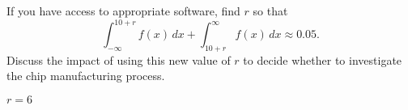 \begin{exercises}


\exercise If you have access to appropriate software, find $r$ so that
$$
  \int_{-\infty}^{10+r} f(x)\,dx + \int_{10+r}^{\infty} f(x)\,dx \approx0.05.
$$
Discuss the impact of using this new value of $r$ to decide whether to 
investigate the chip manufacturing process.
\begin{answer} $r=6$
\end{answer}

\end{exercises}
